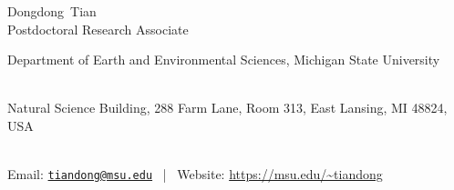 \documentclass[11pt, a4paper]{article}
\makeatletter
\newcommand{\FirstName}{Dongdong}
\newcommand{\LastName}{Tian}
\newcommand{\MyName}{\FirstName\ \LastName}
\newcommand{\MyRole}{Postdoctoral Research Associate}
\newcommand{\Email}{tiandong@msu.edu}
\newcommand{\Website}{https://msu.edu/~tiandong}
\newcommand{\Affiliation}{
    Department of Earth and Environmental Sciences,
    Michigan State University
}
\newcommand{\Address}{
    Natural Science Building, 288 Farm Lane, Room 313, East Lansing, MI 48824, USA
}
\newcommand{\makefield}[2]{\makebox[1.5em]{\color{MarkerColour!80!black}#1} #2}
\makeatother
\begin{document}
\thispagestyle{empty}

\begin{center}
    {\fontsize{36pt}{0}\selectfont \MyName}
    \\[0.5cm]
    {\fontsize{16pt}{0}\selectfont \MyRole}
    \\[0.3cm]
    {\fontsize{10pt}{0}\selectfont
        \Affiliation
        \\[0.2cm]
        \Address
        \\[0.08cm]
        Email: \href{mailto:\Email}{\texttt{\Email}}
        \, | \,
        Website: \url{\Website}
    }
\end{center}












%
\end{document}
